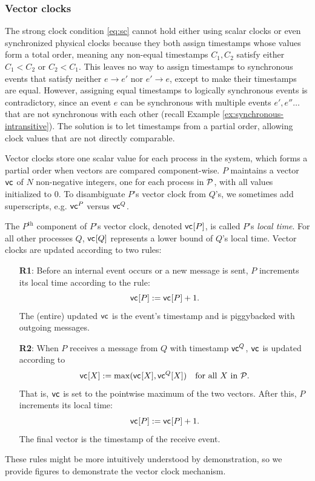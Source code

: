 \documentclass[]             %
{NASA}                       %
\theoremstyle{definition}
\begin{document}
\subsubsection{Vector clocks}
\label{sssec:vector-clocks}
The strong clock condition \eqref{eq:sc} cannot hold either using
scalar clocks or even synchronized physical clocks because they both
assign timestamps whose values form a total order, meaning any
non-equal timestamps $C_1, C_2$ satisfy either $C_1 < C_2$ or
$C_2 < C_1$. This leaves no way to assign timestamps to synchronous
events that satisfy neither $e \to e'$ nor $e' \to e$, except to make
their timestamps are equal. However, assigning equal timestamps to
logically synchronous events is contradictory, since an event $e$ can
be synchronous with multiple events $e', e''\ldots$ that are not
synchronous with each other (recall Example
\ref{ex:synchronous-intransitive}). The solution is to let timestamps
from a partial order, allowing clock values that are not directly
comparable.

Vector clocks store one scalar value for each process in the system,
which forms a partial order when vectors are compared
component-wise. $P$ maintains a vector $\mathsf{vc}^{}$ of $N$ non-negative
integers, one for each process in $\mathcal{P}$, with all values
initialized to $0$. To disambiguate $P$'s vector clock from $Q$'s, we
sometimes add superscripts, e.g. $\mathsf{vc}^{P}$ versus $\mathsf{vc}^{Q}$.

The $P^\textrm{th}$ component of $P$'s vector clock, denoted
$\mathsf{vc}^{}[P]$, is called $P$'s \emph{local time}. For all other processes
$Q$, $\mathsf{vc}^{}[Q]$ represents a lower bound of $Q$'s local time. Vector
clocks are updated according to two rules:
\begin{enumerate}
\item[\textbf{R1}:] Before an internal event occurs or a new message is sent, $P$
  increments its local time according to the rule:
  \[\mathsf{vc}^{}[P] := \mathsf{vc}^{}[P] + 1.\]
  The (entire) updated $\mathsf{vc}^{}$ is the event's timestamp and is piggybacked with outgoing messages.
\item[\textbf{R2}:] When $P$ receives a message from $Q$ with timestamp
  $\mathsf{vc}^{Q}$, $\mathsf{vc}^{}$ is updated according to
  \[\mathsf{vc}^{}[X] := \max(\mathsf{vc}^{}[X], \mathsf{vc}^{Q}[X]) \quad \textrm{for all $X$ in $\mathcal{P}$}.\]
  That is, $\mathsf{vc}^{}$ is set to the pointwise maximum of the two
  vectors. After this, $P$ increments its local time:
  \[ \mathsf{vc}^{}[P] := \mathsf{vc}^{}[P] + 1.\]
  The final vector is the timestamp of the receive event.
\end{enumerate}
These rules might be more intuitively understood by demonstration, so we provide figures to demonstrate the vector clock mechanism.
\end{document}
